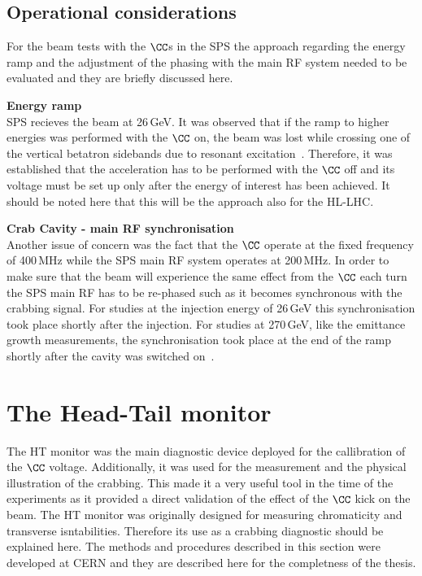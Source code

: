 \subsection{Operational considerations}

For the beam tests with the $\CC$s in the SPS the approach regarding the energy ramp and the adjustment of the phasing with the main RF system needed to be evaluated and they are briefly discussed here.


\normalsize{\textbf{Energy ramp}}\\
SPS recieves the beam at 26\,GeV. It was observed that if the ramp to higher energies was performed with the $\CC$ on, the beam was lost while crossing one of the vertical betatron sidebands due to resonant excitation~\cite{Rama_Paris_persentation}. Therefore, it was established that the acceleration has to be performed with the $\CC$ off and its voltage must be set up only after the energy of interest has been achieved. It should be noted here that this will be the approach also for the HL-LHC.

\normalsize{\textbf{Crab Cavity - main RF synchronisation}}\\
Another issue of concern was the fact that the $\CC$ operate at the fixed frequency of 400\,MHz while the SPS main RF system operates at 200\,MHz.
In order to make sure that the beam will experience the same effect from the $\CC$ each turn the SPS main RF has to be re-phased such as it becomes synchronous with the crabbing signal. For studies at the injection energy of 26\,GeV this synchronisation took place shortly after the injection. For studies at 270\,GeV, like the emittance growth measurements, the synchronisation took place at the end of the ramp shortly after the cavity was switched on~\cite{BE_seminar}.


\section{The Head-Tail monitor}\label{sec:HT_info}
The HT monitor was the main diagnostic device deployed for the callibration of the $\CC$ voltage. Additionally, it was used for the measurement and the physical illustration of the crabbing. This made it a very useful tool in the time of the experiments as it provided a direct validation of the effect of the $\CC$ kick on the beam. The HT monitor was originally designed for measuring chromaticity and transverse isntabilities. Therefore its use as a crabbing diagnostic should be explained here. The methods and procedures described in this section were developed at CERN and they are described here for the completness of the thesis.

